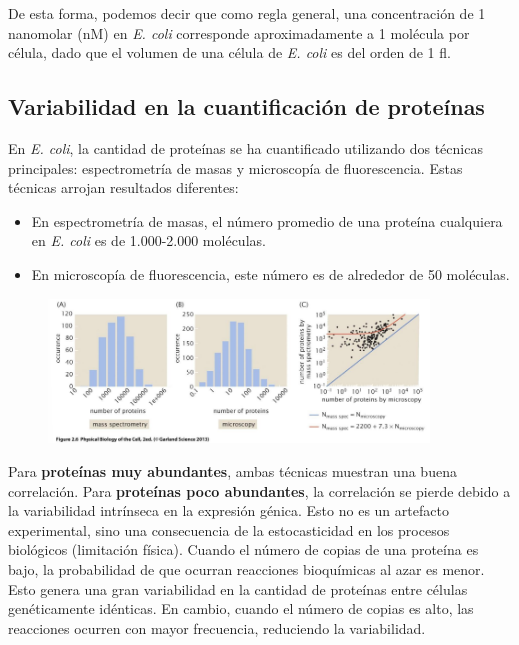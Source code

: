 De esta forma, podemos decir que como regla general, una concentración de 1 nanomolar (nM) en \textit{E. coli} corresponde aproximadamente a 1 molécula por célula, dado que el volumen de una célula de \textit{E. coli} es del orden de 1 fl.

\subsection{Variabilidad en la cuantificación de proteínas}
En \textit{E. coli}, la cantidad de proteínas se ha cuantificado utilizando dos técnicas principales: espectrometría de masas y microscopía de fluorescencia. Estas técnicas arrojan resultados diferentes:
\begin{itemize}
\item En espectrometría de masas, el número promedio de una proteína cualquiera en \textit{E. coli} es de 1.000-2.000 moléculas.
\item En microscopía de fluorescencia, este número es de alrededor de 50 moléculas.
\end{itemize}

\begin{figure}[h]
\centering
\includegraphics[width = 0.9\textwidth]{figs/mol-census.png}
\end{figure}

Para \textbf{proteínas muy abundantes}, ambas técnicas muestran una buena correlación.
Para \textbf{proteínas poco abundantes}, la correlación se pierde debido a la variabilidad intrínseca en la expresión génica. Esto no es un artefacto experimental, sino una consecuencia de la estocasticidad en los procesos biológicos (limitación física). Cuando el número de copias de una proteína es bajo, la probabilidad de que ocurran reacciones bioquímicas al azar es menor. Esto genera una gran variabilidad en la cantidad de proteínas entre células genéticamente idénticas. En cambio, cuando el número de copias es alto, las reacciones ocurren con mayor frecuencia, reduciendo la variabilidad.


